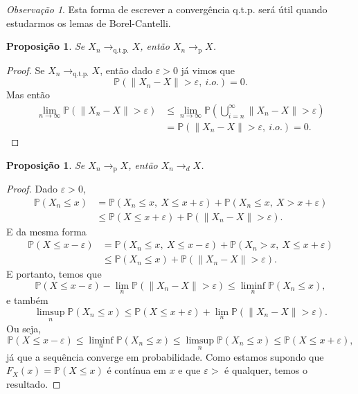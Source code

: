 \documentclass[12pt,a4paper,oneside]{book}
\newtheorem{proposition}[theorem]{Proposi\c{c}\~ao}
\theoremstyle{definition}
\theoremstyle{remark}
\newtheorem{remark}[theorem]{Observa\c{c}\~ao}
\numberwithin{equation}{section}
\newcommand{\e}{\varepsilon}
\newcommand{\pr}{\mathbb{P}}
\newcommand{\ds}{\displaystyle}
\begin{document}
\begin{tcolorbox}[colback = yellow!60]

\begin{remark}
Esta forma de escrever a convergência q.t.p. será útil quando estudarmos os lemas de Borel-Cantelli.

\end{remark}

\end{tcolorbox}


\begin{proposition}
Se $X_n \rightarrow_{\text{q.t.p.}} X$, então $X_n \rightarrow_{\text{p}} X$.
\end{proposition}
\begin{proof}
Se $X_n \rightarrow_{\text{q.t.p.}} X$, então dado $\e>0$ já vimos que
$$\pr(\|X_n-X\|> \e,\ i.o.)  = 0. $$ Mas então
\begin{align*}
\lim_{n\rightarrow\infty}\pr(\|X_n-X\|> \e) &\leq \lim_{n\rightarrow\infty} \pr\left(\bigcup_{i=n}^\infty\|X_n-X\|> \e\right)\\
&= \pr(\|X_n-X\|>\e,\ i.o.) = 0.
\end{align*}
\end{proof}

\begin{proposition}
Se $X_n \rightarrow_{\text{p}} X$, então $X_n \rightarrow_{d} X$.
\end{proposition}

\begin{proof}
Dado $\e>0$,
\begin{align*}
\pr(X_n\leq x) & = \pr(X_n\leq x,\ X\leq x+\e) + \pr(X_n\leq x,\ X> x+\e)\\
&\leq \pr(X\leq x+\e) + \pr(\|X_n-X\|>\e).
\end{align*}
E da mesma forma
\begin{align*}
\pr(X\leq x-\e) & = \pr(X_n\leq x,\ X\leq x-\e) + \pr(X_n> x,\ X\leq x+\e)\\
&\leq \pr(X_n\leq x) + \pr(\|X_n-X\|>\e).
\end{align*}
E portanto, temos que
$$\ds\pr(X\leq x-\e) -  \lim_n\pr(\|X_n-X\|>\e)\leq \ds \liminf_n\pr(X_n\leq x),$$
e também
$$  \ds \limsup_n \pr(X_n\leq x)\leq \ds\pr(X\leq x+\e)+ \lim_n\pr(\|X_n-X\|>\e).$$
Ou seja, 
$$ \pr(X\leq x-\e)\leq\liminf_n\pr(X_n\leq x)\leq \limsup_n \pr(X_n\leq x)\leq \ds\pr(X\leq x+\e),$$
já que a sequência converge em probabilidade.
Como estamos supondo que $F_X(x) = \pr(X\leq x)$ é contínua em $x$ e que $\e>$ é qualquer, temos o resultado.
\end{proof}
\end{document}
